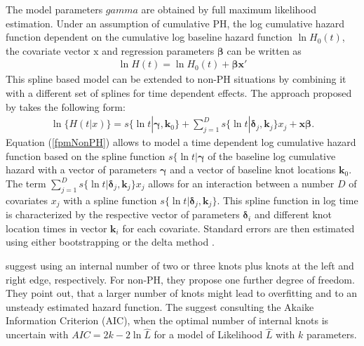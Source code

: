 \documentclass[main.tex]{subfiles}
\begin{document}
The model parameters $gamma$ are obtained by full maximum likelihood estimation. Under an assumption of cumulative PH, the log cumulative hazard function dependent on the cumulative log baseline hazard function $\ln{H_0(t)}$, the covariate vector $\text{x}$ and regression parameters $\bm{\beta}$ can be written as
\begin{align}\label{fpmPH}
\ln{H(t)} = \ln{H_0(t)} + \bm{\beta}\bm{x'}
\end{align}
 This spline based model can be extended to non-PH situations by combining it with a different set of splines for time dependent effects. The approach proposed by \textcite{royston2011flexible} takes the following form:
 \begin{align}\label{fpmNonPH}
\ln{\{H(t|x)\}}=s\{\ln{t}|\bm{\gamma},\bm{k}_0\}+\sum^D_{j=1}s\{\ln{t}|\bm{\delta}_j, \bm{k}_j\}x_j + \bm{x\beta}.
\end{align} 
 Equation (\ref{fpmNonPH}) allows to model a time dependent log cumulative hazard function based on the spline function $s\{\ln{t}|\bm{\gamma}$ of the baseline log cumulative hazard with a vector of parameters $\bm{\gamma}$ and a vector of baseline knot locations $\bm{k}_0$. The term $\sum^D_{j=1}s\{\ln{t}|\bm{\delta}_j, \bm{k}_j\}x_j$ allows for an interaction between a number $D$ of covariates $x_j$ with a spline function $s\{\ln{t}|\bm{\delta}_j, \bm{k}_j\}$. This spline function in log time is characterized by the respective vector of parameters $\bm{\delta}_i$ and different knot location times in vector $\bm{k}_i$ for each covariate. Standard errors are then estimated using either bootstrapping or the delta method \parencite{Royston2011-bd}.
 
\textcite{Royston2002-ud} suggest using an internal number of two or three knots plus knots at the left and right edge, respectively. For non-PH, they propose one further degree of freedom. They point out, that a larger number of knots might lead to overfitting and to an unsteady estimated hazard function. The suggest consulting the Akaike Information Criterion (AIC), when the optimal number of internal knots is uncertain with $AIC = 2k - 2\ln{\hat{L}}$ for a model of Likelihood $\hat{L}$ with $k$ parameters.
\end{document}
